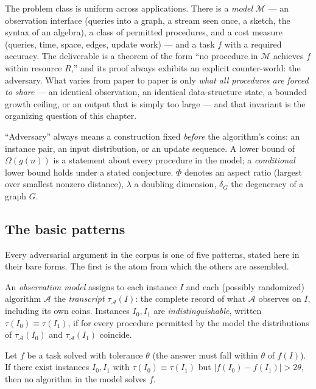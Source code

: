 The problem class is uniform across applications. There is a \emph{model} $\mathcal{M}$ --- an
observation interface (queries into a graph, a stream seen once, a sketch, the syntax of an
algebra), a class of permitted procedures, and a cost measure (queries, time, space, edges,
update work) --- and a task $f$ with a required accuracy. The deliverable is a theorem of the
form ``no procedure in $\mathcal{M}$ achieves $f$ within resource $R$,'' and its proof always
exhibits an explicit counter-world: the adversary. What varies from paper to paper is only
\emph{what all procedures are forced to share} --- an identical observation, an identical
data-structure state, a bounded growth ceiling, or an output that is simply too large --- and
that invariant is the organizing question of this chapter.

\begin{remarkbox}[Notation]
``Adversary'' always means a construction fixed \emph{before} the algorithm's coins: an instance
pair, an input distribution, or an update sequence. A lower bound of $\Omega(g(n))$ is a
statement about every procedure in the model; a \emph{conditional} lower bound holds under a
stated conjecture. $\Phi$ denotes an aspect ratio (largest over smallest nonzero distance),
$\lambda$ a doubling dimension, $\delta_G$ the degeneracy of a graph $G$.
\end{remarkbox}

\subsection{The basic patterns}
\label{sec:adv-patterns}

Every adversarial argument in the corpus is one of five patterns, stated here in their bare
forms. The first is the atom from which the others are assembled.

\begin{definition}\label{def:adv-transcript}
An \emph{observation model} assigns to each instance $I$ and each (possibly randomized)
algorithm $\mathcal{A}$ the \emph{transcript} $\tau_{\mathcal{A}}(I)$: the complete record of
what $\mathcal{A}$ observes on $I$, including its own coins. Instances $I_0, I_1$ are
\emph{indistinguishable}, written $\tau(I_0) \equiv \tau(I_1)$, if for every procedure permitted
by the model the distributions of $\tau_{\mathcal{A}}(I_0)$ and $\tau_{\mathcal{A}}(I_1)$
coincide.
\end{definition}

\begin{proposition}\label{prop:adv-indist}
Let $f$ be a task solved with tolerance $\theta$ (the answer must fall within $\theta$ of
$f(I)$). If there exist instances $I_0, I_1$ with $\tau(I_0) \equiv \tau(I_1)$ but
$|f(I_0) - f(I_1)| > 2\theta$, then no algorithm in the model solves $f$. \eop
\end{proposition}

